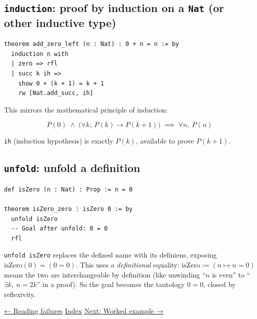 \subsection{\texorpdfstring{\texttt{induction}: proof by induction on a \texttt{Nat} (or other inductive type)}{induction: proof by induction on a Nat (or other inductive type)}}\label{sec:04-tactics:04-more-tactics:5}

\begin{lstlisting}
theorem add_zero_left (n : Nat) : 0 + n = n := by
  induction n with
  | zero => rfl
  | succ k ih =>
    show 0 + (k + 1) = k + 1
    rw [Nat.add_succ, ih]
\end{lstlisting}

This mirrors the mathematical principle of induction:

\[
P(0) \;\land\; \big(\forall k,\ P(k) \to P(k+1)\big) \;\implies\; \forall n,\ P(n)
\]

\texttt{ih} (induction hypothesis) is exactly \(P(k)\), available to prove \(P(k+1)\).

\subsection{\texorpdfstring{\texttt{unfold}: unfold a definition}{unfold: unfold a definition}}\label{sec:04-tactics:04-more-tactics:6}

\begin{lstlisting}
def isZero (n : Nat) : Prop := n = 0

theorem isZero_zero : isZero 0 := by
  unfold isZero
  -- Goal after unfold: 0 = 0
  rfl
\end{lstlisting}

\begin{mathreading}

\texttt{unfold isZero} replaces the defined name with its definiens, exposing \(\mathrm{isZero}(0) = (0 = 0)\). This uses a \emph{definitional} equality: \(\mathrm{isZero} := (n \mapsto n = 0)\) means the two are interchangeable by definition (like unwinding ``\(n\) is even'' to ``\(\exists k,\ n = 2k\)'' in a proof). So the goal becomes the tautology \(0 = 0\), closed by reflexivity.

\end{mathreading}

\hyperref[sec:04-tactics:03-reading-failures:1]{← Reading failures} \textbar{} \hyperref[sec:04-tactics:00-index:1]{Index} \textbar{} \hyperref[sec:04-tactics:05-worked-example:1]{Next: Worked example →}
